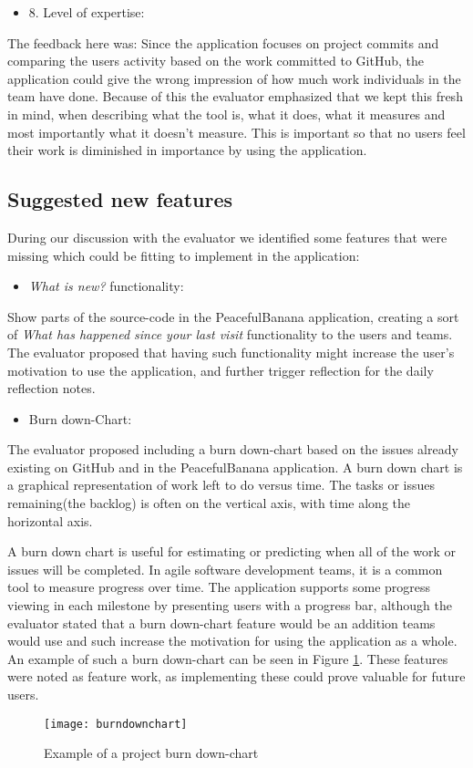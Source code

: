 \begin{itemize}
    \item 8. Level of expertise:   
\end{itemize}
The feedback here was: Since the application focuses on project commits and comparing the users activity based on the work committed to GitHub, the application could give the wrong impression of how much work individuals in the team have done. Because of this the evaluator emphasized that we kept this fresh in mind, when describing what the tool is, what it does, what it measures and most importantly what it doesn't measure. This is important so that no users feel their work is diminished in importance by using the application.

\subsection{Suggested new features}
During our discussion with the evaluator we identified some features that were missing which could be fitting to implement in the application:
\begin{itemize}
	\item \emph{What is new?} functionality:
\end{itemize}
Show parts of the source-code in the PeacefulBanana application, creating a sort of \emph{What has happened since your last visit} functionality to the users and teams. The evaluator proposed that having such functionality might increase the user's motivation to use the application, and further trigger reflection for the daily reflection notes. 
\begin{itemize}
	\item Burn down-Chart:
\end{itemize}
The evaluator proposed including a burn down-chart based on the issues already existing on GitHub and in the PeacefulBanana application. A burn down chart is a graphical representation of work left to do versus time. The tasks or issues remaining(the backlog) is often on the vertical axis, with time along the horizontal axis.

A burn down chart is useful for estimating or predicting when all of the work or issues will be completed. In agile software development teams, it is a common tool to measure progress over time. The application supports some progress viewing in each milestone by presenting users with a progress bar, although the evaluator stated that a burn down-chart feature would be an addition teams would use and such increase the motivation for using the application as a whole. An example of such a burn down-chart can be seen in Figure \ref{burndownchart}. 
These features were noted as feature work, as implementing these could prove valuable for future users. 

\begin{figure}[H]
    \centering
        \texttt{[image: burndownchart]}
    \caption{Example of a project burn down-chart \citep{agileburndownchart}}
    \label{burndownchart}
\end{figure}
\clearpage

